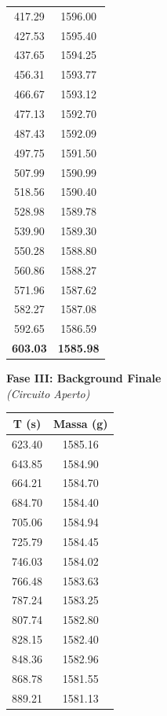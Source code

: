 \documentclass[a4paper,12pt]{article}
\begin{document}
\begin{table}[htbp]
\begin{minipage}[t]{0.33\textwidth}
\begin{tabular}{cc}
417.29 & 1596.00 \\
427.53 & 1595.40 \\
437.65 & 1594.25 \\
456.31 & 1593.77 \\
466.67 & 1593.12 \\
477.13 & 1592.70 \\
487.43 & 1592.09 \\
497.75 & 1591.50 \\
507.99 & 1590.99 \\
518.56 & 1590.40 \\
528.98 & 1589.78 \\
539.90 & 1589.30 \\
550.28 & 1588.80 \\
560.86 & 1588.27 \\
571.96 & 1587.62 \\
582.27 & 1587.08 \\
592.65 & 1586.59 \\
\textbf{603.03} & \textbf{1585.98} \\
\bottomrule
\end{tabular}
\end{minipage}
\hfill
\begin{minipage}[t]{0.31\textwidth}
\centering
\textbf{Fase III: Background Finale} \\
\textit{(Circuito Aperto)} \\
\vspace{0.2cm}
\begin{tabular}{cc}
\toprule
\textbf{T (s)} & \textbf{Massa (g)} \\
\midrule
623.40 & 1585.16 \\
643.85 & 1584.90 \\
664.21 & 1584.70 \\
684.70 & 1584.40 \\
705.06 & 1584.94 \\
725.79 & 1584.45 \\
746.03 & 1584.02 \\
766.48 & 1583.63 \\
787.24 & 1583.25 \\
807.74 & 1582.80 \\
828.15 & 1582.40 \\
848.36 & 1582.96 \\
868.78 & 1581.55 \\
889.21 & 1581.13 \\
\bottomrule
\end{tabular}
\end{minipage}

\end{table}
\end{document}
